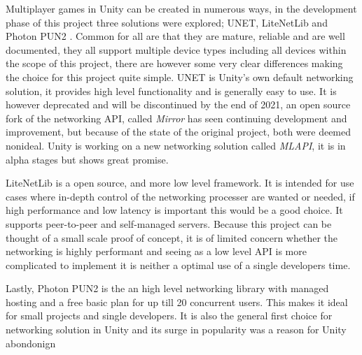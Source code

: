 Multiplayer games in Unity can be created in numerous ways, in the development phase of this project three solutions were explored; UNET,  LiteNetLib and Photon PUN2 . Common for all are that they are mature, reliable and are well documented, they all support multiple device types including all devices within the scope of this project, there are however some very clear differences making the choice for this project quite simple.
UNET is Unity's own default networking solution, it provides high level functionality and is generally easy to use. It is however deprecated and will be discontinued by the end of 2021, an open source fork of the networking API, called \textit{Mirror} has seen continuing development and improvement, but because of the state of the original project, both were deemed nonideal. Unity is working on a new networking solution called \textit{MLAPI}, it is in alpha stages but shows great promise.

LiteNetLib is a open source, and more low level framework. It is intended for use cases where in-depth control of the networking processer are wanted or needed, if high performance and low latency is important this would be a good choice. It supports peer-to-peer and self-managed servers. Because this project can be thought of a small scale proof of concept, it is of limited concern whether the networking is highly performant and seeing as a low level API is more complicated to implement it is neither a optimal use of a single developers time.

Lastly, Photon PUN2 is the an high level networking library with managed hosting and a free basic plan for up till 20 concurrent users. This makes it ideal for small projects and single developers. It is also the general first choice for networking solution in Unity and its surge in popularity was a reason for Unity abondonign 



